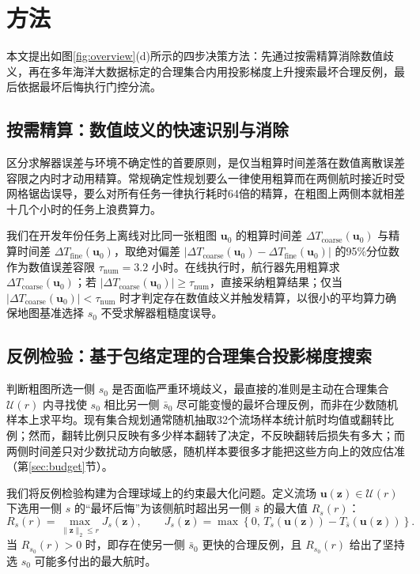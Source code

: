 \section{方法}

本文提出如图\ref{fig:overview}(d)所示的四步决策方法：先通过按需精算消除数值歧义，再在多年海洋大数据标定的合理集合内用投影梯度上升搜索最坏合理反例，最后依据最坏后悔执行门控分流。

\subsection{按需精算：数值歧义的快速识别与消除}
区分求解器误差与环境不确定性的首要原则，是仅当粗算时间差落在数值离散误差容限之内时才动用精算。常规确定性规划要么一律使用粗算而在两侧航时接近时受网格锯齿误导，要么对所有任务一律执行耗时64倍的精算，在粗图上两侧本就相差十几个小时的任务上浪费算力。

我们在开发年份任务上离线对比同一张粗图 $\boldsymbol{u}_0$ 的粗算时间差 $\Delta T_{\text{coarse}}(\boldsymbol{u}_0)$ 与精算时间差 $\Delta T_{\text{fine}}(\boldsymbol{u}_0)$，取绝对偏差 $|\Delta T_{\text{coarse}}(\boldsymbol{u}_0) - \Delta T_{\text{fine}}(\boldsymbol{u}_0)|$ 的95\%分位数作为数值误差容限 $\tau_{\text{num}} = 3.2$ 小时。在线执行时，航行器先用粗算求 $\Delta T_{\text{coarse}}(\boldsymbol{u}_0)$；若 $|\Delta T_{\text{coarse}}(\boldsymbol{u}_0)| \ge \tau_{\text{num}}$，直接采纳粗算结果；仅当 $|\Delta T_{\text{coarse}}(\boldsymbol{u}_0)| < \tau_{\text{num}}$ 时才判定存在数值歧义并触发精算，以很小的平均算力确保地图基准选择 $s_0$ 不受求解器粗糙度误导。

\subsection{反例检验：基于包络定理的合理集合投影梯度搜索}
判断粗图所选一侧 $s_0$ 是否面临严重环境歧义，最直接的准则是主动在合理集合 $\mathcal{U}(r)$ 内寻找使 $s_0$ 相比另一侧 $\bar{s}_0$ 尽可能变慢的最坏合理反例，而非在少数随机样本上求平均。现有集合规划通常随机抽取32个流场样本统计航时均值或翻转比例\cite{wang2016path}；然而，翻转比例只反映有多少样本翻转了决定，不反映翻转后损失有多大；而两侧时间差只对少数扰动方向敏感，随机样本要很多才能把这些方向上的效应估准（第\ref{sec:budget}节）。

我们将反例检验构建为合理球域上的约束最大化问题。定义流场 $\boldsymbol{u}(\boldsymbol{z}) \in \mathcal{U}(r)$ 下选用一侧 $s$ 的“最坏后悔”为该侧航时超出另一侧 $\bar{s}$ 的最大值 $R_s(r)$：
\begin{equation}
R_s(r) = \max_{\|\boldsymbol{z}\|_2 \le r} J_s(\boldsymbol{z}), \qquad J_s(\boldsymbol{z}) = \max\left\{ 0,\, T_s(\boldsymbol{u}(\boldsymbol{z})) - T_{\bar{s}}(\boldsymbol{u}(\boldsymbol{z})) \right\}.
\label{eq:worst_regret}
\end{equation}
当 $R_{s_0}(r) > 0$ 时，即存在使另一侧 $\bar{s}_0$ 更快的合理反例，且 $R_{s_0}(r)$ 给出了坚持选 $s_0$ 可能多付出的最大航时。

